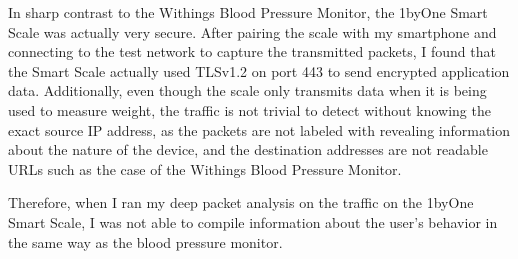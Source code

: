 In sharp contrast to the Withings Blood Pressure Monitor, the 1byOne Smart Scale was actually very secure. After pairing the scale with my smartphone and connecting to the test network to capture the transmitted packets, I found that the Smart Scale actually used TLSv1.2 on port 443 to send encrypted application data. Additionally, even though the scale only transmits data when it is being used to measure weight, the traffic is not trivial to detect without knowing the exact source IP address, as the packets are not labeled with revealing information about the nature of the device, and the destination addresses are not readable URLs such as the case of the Withings Blood Pressure Monitor. 

Therefore, when I ran my deep packet analysis on the traffic on the 1byOne Smart Scale, I was not able to compile information about the user's behavior in the same way as the blood pressure monitor. 
